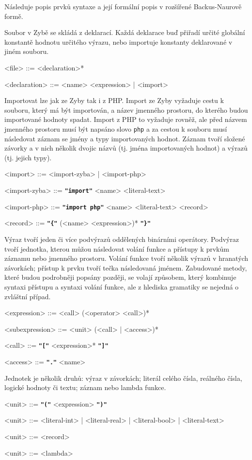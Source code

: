 \documentclass[a4paper,12pt]{article}
\def\quote #1{"#1"}
\def\emphasis #1{\textbf{\texttt{\quote{#1}}}}
\begin{document}
Následuje popis prvků syntaxe a její formální popis v rozšířené Backus-Naurově formě.

Soubor v Zybě se skládá z deklarací. Každá deklarace buď přiřadí určité globální konstantě hodnotu určitého výrazu, nebo importuje konstanty deklarované v jiném souboru.
\begin{grammar}
<file> ::= <declaration>*

<declaration> ::= <name> <expression> | <import>
\end{grammar}

Importovat lze jak ze Zyby tak i z PHP. Import ze Zyby vyžaduje cestu k souboru, který má být importován, a název jmenného prostoru, do kterého budou importované hodnoty spadat. Import z PHP to vyžaduje rovněž, ale před názvem jmenného prostoru musí být napsáno slovo \texttt{php} a za cestou k souboru musí následovat záznam se jmény a typy importovaných hodnot. Záznam tvoří složené závorky a v nich několik dvojic názvů (tj. jména importovaných hodnot) a výrazů (tj. jejich typy).
\begin{grammar}
<import> ::= <import-zyba> | <import-php>

<import-zyba> ::= \emphasis{import} <name> <literal-text>

<import-php> ::= \emphasis{import php} <name> <literal-text> <record>

<record> ::= \emphasis{\{} (<name> <expression>)* \emphasis{\}}
\end{grammar}

Výraz tvoří jeden či více podvýrazů oddělených binárními operátory. Podvýraz tvoří jednotka, kterou můžou následovat volání funkce a přístupy k prvkům záznamu nebo jmenného prostoru. Volání funkce tvoří několik výrazů v hranatých závorkách; přístup k prvku tvoří tečka následovaná jménem. Zabudované metody, které budou podrobněji popsány později, se volají způsobem, který kombinuje syntaxi přístupu a syntaxi volání funkce, ale z hlediska gramatiky se nejedná o zvláštní případ.
\begin{grammar}
<expression> ::= <call> (<operator> <call>)*

<subexpression> ::= <unit> (<call> | <access>)*

<call> ::= \emphasis{[} <expression>* \emphasis{]}

<access> ::= \emphasis{.} <name>
\end{grammar}

Jednotek je několik druhů: výraz v závorkách; literál celého čísla, reálného čísla, logické hodnoty či textu; záznam nebo lambda funkce.
\begin{grammar}
<unit> ::= \emphasis{(} <expression> \emphasis{)}

<unit> ::= <literal-int> | <literal-real> | <literal-bool> | <literal-text>

<unit> ::= <record>

<unit> ::= <lambda>
\end{grammar}
\end{document}
